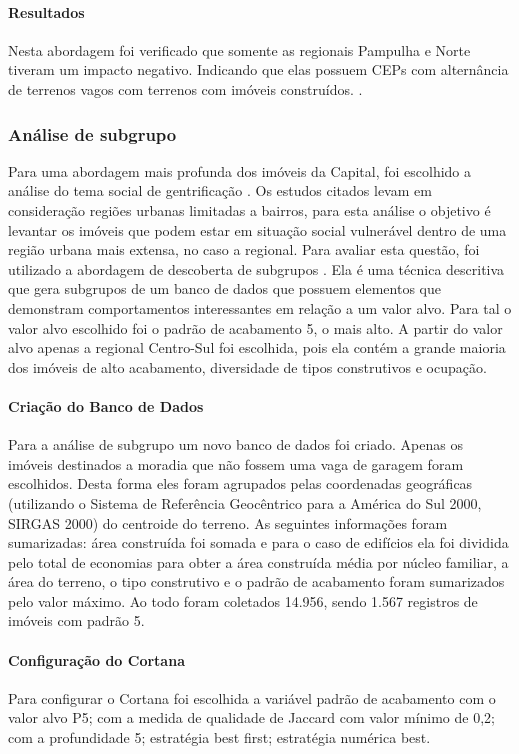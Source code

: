 \documentclass[12pt]{article}
\begin{document}
\paragraph{Resultados}
Nesta abordagem foi verificado que somente as regionais Pampulha e Norte tiveram um impacto negativo. Indicando que elas possuem CEPs com alternância de terrenos vagos com terrenos com imóveis construídos.
\cite{wiki:cornubacao}.

\subsubsection{Análise de subgrupo}
Para uma abordagem mais profunda dos imóveis da Capital, foi escolhido a análise do tema social de gentrificação \cite{dos2019sapucai, solla2019resistencia, andrade2020urban}. Os estudos citados levam em consideração regiões urbanas limitadas a bairros, para esta análise o objetivo é levantar os imóveis que podem estar em situação social vulnerável dentro de uma região urbana mais extensa, no caso a regional. Para avaliar esta questão, foi utilizado a abordagem de descoberta de subgrupos \cite{atzmueller2015subgroup}. Ela é uma técnica descritiva que gera subgrupos de um banco de dados que possuem elementos que demonstram comportamentos interessantes em relação a um valor alvo. Para tal o valor alvo escolhido foi o padrão de acabamento 5, o mais alto. A partir do valor alvo apenas a regional Centro-Sul foi escolhida, pois ela contém a grande maioria dos imóveis de alto acabamento, diversidade de tipos construtivos e ocupação.

\paragraph{Criação do Banco de Dados}
Para a análise de subgrupo um novo banco de dados foi criado. Apenas os imóveis destinados a moradia que não fossem uma vaga de garagem foram escolhidos. Desta forma eles foram agrupados pelas coordenadas geográficas (utilizando o Sistema de Referência Geocêntrico para a América do Sul 2000, SIRGAS 2000) do centroide do terreno. As seguintes informações foram sumarizadas: área construída foi somada e para o caso de edifícios ela foi dividida pelo total de economias para obter a área construída média por núcleo familiar, a área do terreno, o tipo construtivo e o padrão de acabamento foram sumarizados pelo valor máximo. Ao todo foram coletados 14.956, sendo 1.567 registros de imóveis com padrão 5.

\paragraph{Configuração do Cortana}
Para configurar o Cortana foi escolhida a variável padrão de acabamento com o valor alvo P5; com a medida de qualidade de Jaccard com valor mínimo de 0,2; com a profundidade 5; estratégia best first; estratégia numérica best.
\end{document}
